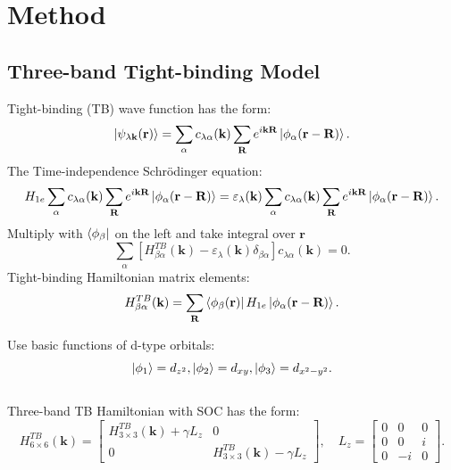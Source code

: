 \documentclass{beamer}
\begin{document}
	\section{Method}
	\subsection{Three-band Tight-binding Model}
	\begin{frame}
		Tight-binding (TB) wave function has the form:
		\begin{equation}
			\ket{\psi_{\lambda \textbf{k}}(\textbf{r})} = \sum_{\alpha} c_{\lambda \alpha} (\textbf{k}) \sum_{\textbf{R}} e^{i\textbf{k}\textbf{R}} \ket{\phi_{\alpha}(\textbf{r}-\textbf{R})}.
		\end{equation}
		The Time-independence Schrödinger equation:
		\begin{equation*}
			H_{1e} \sum_{\alpha} c_{\lambda \alpha} (\textbf{k}) \sum_{\textbf{R}} e^{i\textbf{k}\textbf{R}} \ket{\phi_{\alpha}(\textbf{r}-\textbf{R})} = \varepsilon_{\lambda} (\textbf{k}) \sum_{\alpha} c_{\lambda \alpha} (\textbf{k}) \sum_{\textbf{R}} e^{i\textbf{k}\textbf{R}} \ket{\phi_{\alpha}(\textbf{r}-\textbf{R})}.
		\end{equation*}
		Multiply with $\bra{\phi_{\beta}}$ on the left and take integral over $\textbf{r}$
		\begin{equation}
			\sum_{\alpha} [H^{TB}_{\beta \alpha}(\textbf{k}) - \varepsilon_{\lambda}(\textbf{k})\delta_{\beta\alpha}]c_{\lambda \alpha}(\textbf{k}) = 0.
		\end{equation}
		Tight-binding Hamiltonian matrix elements:
		\begin{equation}
			H^{TB}_{\beta \alpha}(\textbf{k}) = \sum_{\textbf{R}} \bra{\phi_{\beta} (\textbf{r})} H_{1e}\ket{\phi_{\alpha}(\textbf{r}-\textbf{R})}.
		\end{equation}
	\end{frame}
	\begin{frame}
Use basic functions of d-type orbitals: $$\ket{\phi_1} = d_{z^2}, \ket{\phi_2} = d_{xy}, \ket{\phi_3} = d_{x^2- y^2}.$$\\Three-band TB Hamiltonian with SOC has the form:
		\begin{equation*}
			H^{TB}_{6\times 6}(\textbf{k}) = \begin{bmatrix}
				H^{TB}_{3\times 3}(\textbf{k}) + \gamma L_z & 0\\ 0& H^{TB}_{3\times 3}(\textbf{k}) - \gamma L_z
			\end{bmatrix}, \quad L_z= \begin{bmatrix}
			0 & 0 & 0\\
			0 & 0 & i\\
			0 & -i& 0
			\end{bmatrix}.
		\end{equation*}
	\end{frame}
\end{document}
